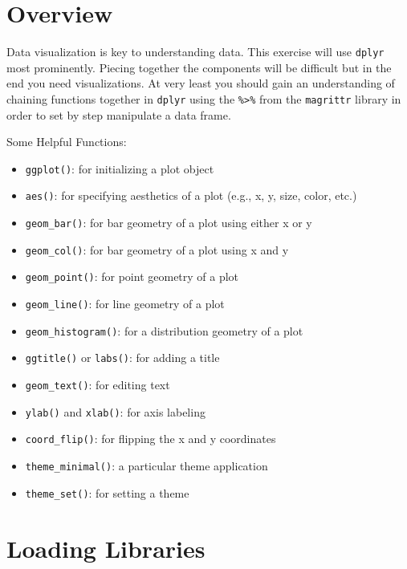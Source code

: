 \documentclass[
  letterpaper,
  DIV=11,
  numbers=noendperiod]{scrartcl}
\providecommand{\tightlist}{%
  \setlength{\itemsep}{0pt}\setlength{\parskip}{0pt}}\usepackage{longtable,booktabs,array}
\begin{document}
\hypertarget{overview}{%
\section{\texorpdfstring{\textbf{Overview}}{Overview}}\label{overview}}

Data visualization is key to understanding data. This exercise will use
\texttt{dplyr} most prominently. Piecing together the components will be
difficult but in the end you need visualizations. At very least you
should gain an understanding of chaining functions together in
\texttt{dplyr} using the \texttt{\%\textgreater{}\%} from the
\texttt{magrittr} library in order to set by step manipulate a data
frame.

Some Helpful Functions:

\begin{itemize}
\tightlist
\item
  \texttt{ggplot()}: for initializing a plot object
\item
  \texttt{aes()}: for specifying aesthetics of a plot (e.g., x, y, size,
  color, etc.)
\item
  \texttt{geom\_bar()}: for bar geometry of a plot using either x or y
\item
  \texttt{geom\_col()}: for bar geometry of a plot using x and y
\item
  \texttt{geom\_point()}: for point geometry of a plot
\item
  \texttt{geom\_line()}: for line geometry of a plot
\item
  \texttt{geom\_histogram()}: for a distribution geometry of a plot
\item
  \texttt{ggtitle()} or \texttt{labs()}: for adding a title
\item
  \texttt{geom\_text()}: for editing text
\item
  \texttt{ylab()} and \texttt{xlab()}: for axis labeling
\item
  \texttt{coord\_flip()}: for flipping the x and y coordinates\\
\item
  \texttt{theme\_minimal()}: a particular theme application
\item
  \texttt{theme\_set()}: for setting a theme
\end{itemize}

\hypertarget{loading-libraries}{%
\section{\texorpdfstring{\textbf{Loading
Libraries}}{Loading Libraries}}\label{loading-libraries}}
\end{document}
